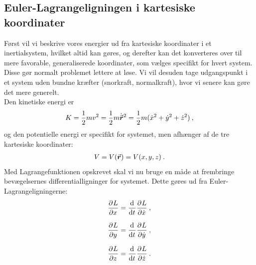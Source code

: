 \subsection*{Euler-Lagrangeligningen i kartesiske koordinater}
Først vil vi beskrive vores energier ud fra kartesiske koordinater i et inertialsystem, hvilket altid kan gøres, og derefter kan det konverteres over til mere favorable, generaliserede koordinater, som vælges specifikt for hvert system. Disse gør normalt problemet lettere at løse. Vi vil desuden tage udgangspunkt i et system uden bundne kræfter (snorkraft, normalkraft), hvor vi senere kan gøre det mere generelt. \\
Den kinetiske energi er
%
\begin{align}\label{Kinetisk_kartesisk}
	K = \frac{1}{2} m v^2 = \frac{1}{2} m \dt{\v{r}}^2 = \frac{1}{2} m (\dt{x}^2 + \dt{y}^2 + \dt{z}^2) \: ,
\end{align}
%
og den potentielle energi er specifikt for systemet, men afhænger af de tre kartesiske koordinater:
%
\begin{align}\label{Potentiel_kartesisk}
	V = V(\v{r}) = V(x,y,z) \: .
\end{align}
%
Med Lagrangefunktionen opskrevet skal vi nu bruge en måde at frembringe bevægelsernes differentialligninger for systemet. Dette gøres ud fra Euler-Lagrangeligningerne:
%
\begin{equation} \label{Euler_lag_kartesisk}
\begin{aligned}
	\pdif{x}{L} &= \dif{t}{} \pdif{\dt{x}}{L} \: , \\[0.75em]
	\pdif{y}{L} &= \dif{t}{} \pdif{\dt{y}}{L} \: , \\[0.75em]
	\pdif{z}{L} &= \dif{t}{} \pdif{\dt{z}}{L} \: .
\end{aligned}
\end{equation}
%
